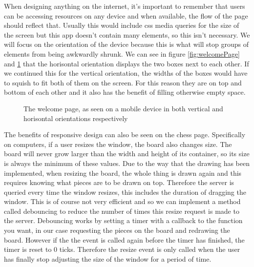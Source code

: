When designing anything on the internet, it's important to remember that users can be accessing resources on any device and when available, the flow of the page should reflect that. Usually this would include css media queries for the size of the screen but this app doesn't contain many elements, so this isn't necessary. We will focus on the orientation of the device because this is what will stop groups of elements from being awkwardly shrunk. We can see in figure \ref{fig:welcomePage} and \ref{fig:responsiveDesign} that the horisontal orientation displays the two boxes next to each other. If we continued this for the vertical orientation, the widths of the boxes would have to squish to fit both of them on the screen. For this reason they are on top and bottom of each other and it also has the benefit of filling otherwise empty space.

\begin{figure}
    \begin{center}
        \captionsetup{justification=centering}

        \hspace{1cm}
        \caption{The welcome page, as seen on a mobile device in both vertical and horisontal orientations respectively}
        \label{fig:responsiveDesign}
    \end{center}
\end{figure}

The benefits of responsive design can also be seen on the chess page. Specifically on computers, if a user resizes the window, the board also changes size. The board will never grow larger than the width and height of its container, so its size is always the minimum of these values. Due to the way that the drawing has been implemented, when resizing the board, the whole thing is drawn again and this requires knowing what pieces are to be drawn on top. Therefore the server is queried every time the window resizes, this includes the duration of dragging the window. This is of course not very efficient and so we can implement a method called debouncing \cite{Debouncing} to reduce the number of times this resize request is made to the server. Debouncing works by setting a timer with a callback to the function you want, in our case requesting the pieces on the board and redrawing the board. However if the the event is called again before the timer has finished, the timer is reset to 0 ticks. Therefore the resize event is only called when the user has finally stop adjusting the size of the window for a period of time.